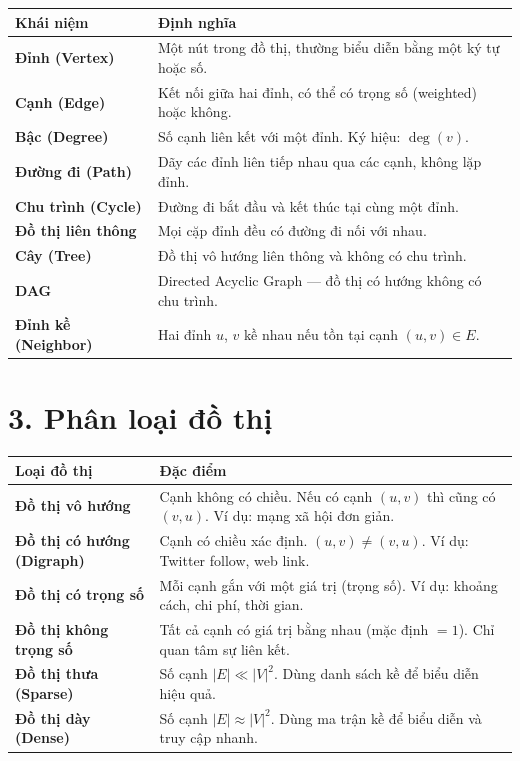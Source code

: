 \documentclass[12pt,a4paper]{article}
\begin{document}
\begin{tabularx}{\textwidth}{>{\ttfamily\bfseries\color{teal}}p{4.5cm} X}
  \toprule
  \normalfont\textbf{Khái niệm} & \textbf{Định nghĩa} \\
  \midrule
  Đỉnh (Vertex)       & Một nút trong đồ thị, thường biểu diễn bằng một ký tự hoặc số. \\
  Cạnh (Edge)         & Kết nối giữa hai đỉnh, có thể có trọng số (weighted) hoặc không. \\
  Bậc (Degree)        & Số cạnh liên kết với một đỉnh. Ký hiệu: $\deg(v)$. \\
  Đường đi (Path)     & Dãy các đỉnh liên tiếp nhau qua các cạnh, không lặp đỉnh. \\
  Chu trình (Cycle)   & Đường đi bắt đầu và kết thúc tại cùng một đỉnh. \\
  Đồ thị liên thông   & Mọi cặp đỉnh đều có đường đi nối với nhau. \\
  Cây (Tree)          & Đồ thị vô hướng liên thông và không có chu trình. \\
  DAG                 & Directed Acyclic Graph --- đồ thị có hướng không có chu trình. \\
  Đỉnh kề (Neighbor)  & Hai đỉnh $u$, $v$ kề nhau nếu tồn tại cạnh $(u, v) \in E$. \\
  \bottomrule
\end{tabularx}

\section{3. Phân loại đồ thị}

\begin{tabularx}{\textwidth}{>{\bfseries}p{5.5cm} X}
  \toprule
  \textbf{Loại đồ thị} & \textbf{Đặc điểm} \\
  \midrule
  Đồ thị vô hướng
    & Cạnh không có chiều. Nếu có cạnh $(u,v)$ thì cũng có $(v,u)$.
      Ví dụ: mạng xã hội đơn giản. \\[4pt]
  Đồ thị có hướng (Digraph)
    & Cạnh có chiều xác định. $(u,v) \neq (v,u)$.
      Ví dụ: Twitter follow, web link. \\[4pt]
  Đồ thị có trọng số
    & Mỗi cạnh gắn với một giá trị (trọng số).
      Ví dụ: khoảng cách, chi phí, thời gian. \\[4pt]
  Đồ thị không trọng số
    & Tất cả cạnh có giá trị bằng nhau (mặc định $= 1$).
      Chỉ quan tâm sự liên kết. \\[4pt]
  Đồ thị thưa (Sparse)
    & Số cạnh $|E| \ll |V|^2$. Dùng danh sách kề để biểu diễn hiệu quả. \\[4pt]
  Đồ thị dày (Dense)
    & Số cạnh $|E| \approx |V|^2$. Dùng ma trận kề để biểu diễn và truy cập nhanh. \\
  \bottomrule
\end{tabularx}
\end{document}
